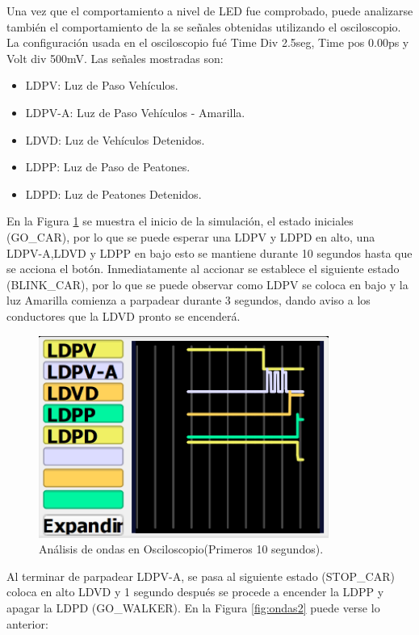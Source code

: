 Una vez que el comportamiento a nivel de LED fue comprobado, puede analizarse también el comportamiento de la se señales obtenidas utilizando el osciloscopio. La configuración usada en el osciloscopio fué Time Div 2.5seg, Time pos 0.00ps y Volt div 500mV. 
 Las señales mostradas son:

\begin{itemize}
    \item LDPV: Luz de Paso Vehículos.
    \item LDPV-A: Luz de Paso Vehículos - Amarilla.
    \item LDVD: Luz de Vehículos Detenidos.
    \item LDPP: Luz de Paso de Peatones.
    \item LDPD: Luz de Peatones Detenidos.
\end{itemize}

En la Figura \ref{fig:ondas1} se muestra el inicio de la simulación, el estado iniciales (GO\_CAR), por lo que se puede esperar una LDPV y LDPD en alto, una LDPV-A,LDVD y LDPP en bajo esto se mantiene durante 10 segundos hasta que se acciona el botón. Inmediatamente al accionar se establece el siguiente estado (BLINK\_CAR), por lo que se puede observar como LDPV se coloca en bajo y la luz Amarilla comienza a parpadear durante 3 segundos, dando aviso a los conductores que la LDVD pronto se encenderá. 

\begin{figure}[H]
\centering
\includegraphics[width=95mm]{./Figuras/Desarrollo_Analisis/Primeros_10_segundos}
\caption{Análisis de ondas en Osciloscopio(Primeros 10 segundos).} 
\label{fig:ondas1}
\end{figure}
    
Al terminar de parpadear LDPV-A, se pasa al siguiente estado (STOP\_CAR) coloca en alto LDVD y 1 segundo después se procede a encender la LDPP y apagar la LDPD (GO\_WALKER). En la Figura \ref{fig:ondas2} puede verse lo anterior:

